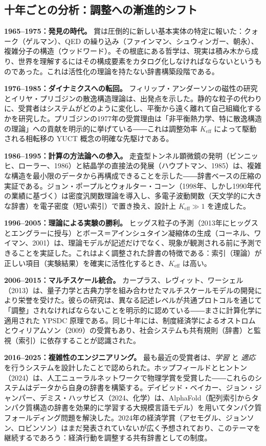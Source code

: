 \documentclass[12pt,a4paper]{article}
\begin{document}
	\subsection{十年ごとの分析：調整への漸進的シフト}
	
	\textbf{1965–1975：発見の時代。} 賞は圧倒的に新しい基本実体の特定に報いた：クォーク（ゲルマン）、QED の繰り込み（ファインマン、シュウィンガー、朝永）、複雑分子の構造（ウッドワード）。その根底にある哲学は、現実は積み木から成り、世界を理解するにはその構成要素をカタログ化しなければならないというものであった。これは活性化の理論を持たない辞書構築段階である。
	
	\textbf{1976–1985：ダイナミクスへの転回。} フィリップ・アンダーソンの磁性の研究とイリヤ・プリゴジンの散逸構造理論は、出発点を示した。静的な粒子の代わりに、受賞者はシステムがどのように変化し、平衡から遠く離れて自己組織化するかを研究した。プリゴジンの1977年の受賞理由は「非平衡熱力学、特に散逸構造の理論」への貢献を明示的に挙げている――これは調整効率 \(K_{\mathrm{eff}}\) によって駆動される相転移の YUCT 概念の明確な先駆けである。
	
	\textbf{1986–1995：計算の方法論への参入。} 走査型トンネル顕微鏡の発明（ビンニッヒ、ローラー、1986）と結晶学の直接法の発展（ハウプトマン、1985）は、複雑な構造を最小限のデータから再構成できることを示した――辞書ベースの圧縮の実証である。ジョン・ポープルとウォルター・コーン（1998年、しかし1990年代の業績に基づく）は密度汎関数理論を導入し、多電子波動関数（天文学的に大きな辞書）を電子密度（短い索引）で置き換え、設計上 \(K_{\mathrm{eff}} \gg 1\) を達成した。
	
	\textbf{1996–2005：理論による実験の勝利。} ヒッグス粒子の予測（2013年にヒッグスとエングラーに授与）とボース＝アインシュタイン凝縮体の生成（コーネル、ワイマン、2001）は、理論モデルが記述だけでなく、現象が観測される前に予測できることを実証した。これはよく調整された辞書の特徴である：索引（理論）が正しい項目（実験結果）を確実に活性化するとき、\(K_{\mathrm{eff}}\) は高い。
	
	\textbf{2006–2015：マルチスケール統合。} カープラス、レヴィット、ワーシェル（2013）は、量子力学と古典力学を組み合わせたマルチスケールモデルの開発により栄誉を受けた。彼らの研究は、異なる記述レベルが共通プロトコルを通じて「調整」されなければならないことを明示的に認めている――まさに計算化学に適用された YPSDC 原理である。同じ十年には、制度経済学によるオストロムとウィリアムソン（2009）の受賞もあり、社会システムも共有規則（辞書）と監視（索引）に依存することが認識された。
	
	\textbf{2016–2025：複雑性のエンジニアリング。} 最も最近の受賞者は、\emph{学習} と \emph{適応} を行うシステムを設計したことで認められた。ホップフィールドとヒントン（2024）は、人工ニューラルネットワークで物理学賞を受賞した――これらのシステムはデータから自身の辞書を構築する。デイビッド・ベイカー、ジョン・ジャンパー、デミス・ハッサビス（2024、化学）は、AlphaFold（配列索引からタンパク質構造の辞書を効果的に学習する大規模言語モデル）を用いてタンパク質フォールディング問題を解決した。2024年の経済学賞（アセモグル、ジョンソン、ロビンソン）はまだ発表されていないが広く予想されており、このテーマを継続するであろう：経済行動を調整する共有辞書としての制度。
	
\end{document}
